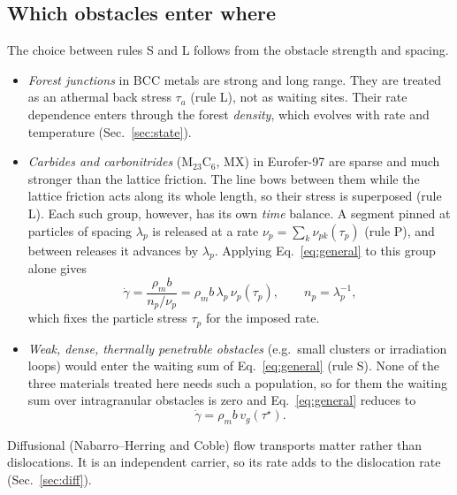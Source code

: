 \documentclass[11pt]{article}
\newcommand{\gd}{\dot\gamma}
\newcommand{\ts}{\tau^{\star}}
\numberwithin{equation}{section}
\begin{document}
\subsection{Which obstacles enter where}
The choice between rules S and L follows from the obstacle strength and spacing.
\begin{itemize}
\item \emph{Forest junctions} in BCC metals are strong and long range. They are treated as an athermal back stress $\tau_a$ (rule L), not as waiting sites. Their rate dependence enters through the forest \emph{density}, which evolves with rate and temperature (Sec.~\ref{sec:state}).
\item \emph{Carbides and carbonitrides} (M$_{23}$C$_6$, MX) in Eurofer-97 are sparse and much stronger than the lattice friction. The line bows between them while the lattice friction acts along its whole length, so their stress is superposed (rule L). Each such group, however, has its own \emph{time} balance. A segment pinned at particles of spacing $\lambda_p$ is released at a rate $\nu_p=\sum_k\nu_{pk}(\tau_p)$ (rule P), and between releases it advances by $\lambda_p$. Applying Eq.~\eqref{eq:general} to this group alone gives
\begin{equation}
\gd=\frac{\rho_m b}{n_p/\nu_p}=\rho_m b\,\lambda_p\,\nu_p(\tau_p),\qquad n_p=\lambda_p^{-1},
\label{eq:group}
\end{equation}
which fixes the particle stress $\tau_p$ for the imposed rate.
\item \emph{Weak, dense, thermally penetrable obstacles} (e.g.\ small clusters or irradiation loops) would enter the waiting sum of Eq.~\eqref{eq:general} (rule S). None of the three materials treated here needs such a population, so for them the waiting sum over intragranular obstacles is zero and Eq.~\eqref{eq:general} reduces to
\begin{equation}
\gd=\rho_m b\,v_g(\ts).
\label{eq:travel_only}
\end{equation}
\end{itemize}

Diffusional (Nabarro--Herring and Coble) flow transports matter rather than dislocations. It is an independent carrier, so its rate adds to the dislocation rate (Sec.~\ref{sec:diff}).

\end{document}
